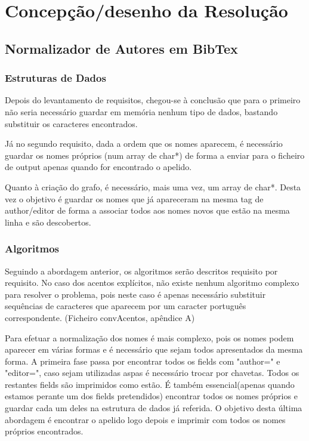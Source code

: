 \documentclass{report}
\begin{document}
\chapter{Concepção/desenho da Resolução} \label{cd}

\section{Normalizador de Autores em BibTex}
\subsection{Estruturas de Dados}
Depois do levantamento de requisitos, chegou-se à conclusão que para o primeiro não 
seria necessário guardar em memória nenhum tipo de dados, bastando substituir os 
caracteres encontrados. 

Já no segundo requisito, dada a ordem que os nomes aparecem, é necessário guardar 
os nomes próprios (num array de char*) de forma a enviar para o
ficheiro de output apenas quando for encontrado o apelido. 

Quanto à criação do grafo, é necessário, mais uma vez, um array de char*. Desta vez 
o objetivo é guardar os nomes que já apareceram na mesma tag de author/editor de 
forma a associar todos aos nomes novos que estão na mesma linha e são descobertos.

\subsection{Algoritmos}
Seguindo a abordagem anterior, os algoritmos serão descritos requisito por requisito.
No caso dos acentos explícitos, não existe nenhum algoritmo complexo para resolver
o problema, pois neste caso é apenas necessário substituir sequências de caracteres 
que aparecem por um caracter português correspondente. (Ficheiro convAcentos, apêndice A)\par

Para efetuar a normalização dos nomes é mais complexo, pois os nomes podem aparecer 
em várias formas e é necessário que sejam todos apresentados da mesma forma. 
A primeira fase passa por encontrar todos os fields com "author=" e "editor=", caso 
sejam utilizadas aspas é necessário trocar por chavetas. Todos os restantes fields são 
imprimidos como estão.
É também essencial(apenas quando estamos perante um dos fields pretendidos) encontrar 
todos os nomes próprios e guardar cada um deles na estrutura de dados já referida. 
O objetivo desta última abordagem é encontrar o
apelido logo depois e imprimir com todos os nomes próprios encontrados.
\end{document}

